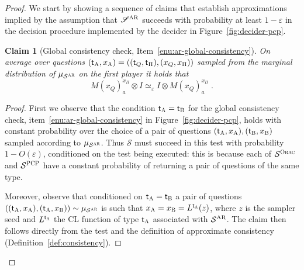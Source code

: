\documentclass[11pt]{article}
\newtheorem{claim}[theorem]{Claim}
\theoremstyle{definition}
\newcommand{\ot}{\otimes}
\newcommand{\eps}{\varepsilon}
\newcommand{\sampler}{\mathcal{S}}
\newcommand{\decider}{\mathcal{D}}
\newcommand{\strategy}{\mathscr{S}}
\newcommand{\gamestyle}[1]{\ensuremath{\textsc{#1}}\xspace}
\newcommand{\ora}{\gamestyle{Orac}}
\newcommand{\pcp}{\gamestyle{PCP}}
\newcommand{\ar}{\gamestyle{AR}}
\newcommand{\labelstyle}[1]{\ensuremath{\textsc{#1}}\xspace}
\newcommand{\tvarstyle}[1]{\mathsf{#1}}
\newcommand{\tvar}{\ensuremath{\tvarstyle{t}}}
\newcommand{\alice}{\labelstyle{A}}
\newcommand{\bob}{\labelstyle{B}}
\begin{document}
\begin{proof}
	We start by showing a sequence of claims that establish approximations implied
  by the assumption that $\strategy^\ar$ succeeds with probability at least
  $1-\eps$ in the decision procedure implemented by the decider in
  Figure~\ref{fig:decider-pcp}.

  \begin{claim}[Global consistency check, Item~\ref{enu:ar-global-consistency}]
    \label{claim:ar-1}
    On average over questions
    $(\tvar_\alice,x_\alice)=((\tvar_Q,\tvar_\Pi),({x}_Q, x_{\Pi}))$ sampled
    from the marginal distribution of $ \mu_{\sampler^\ar}$ on the first player
    it holds that
    \begin{equation}
      \label{eq:global-consistency}
      M({x}_Q)^{x_{\Pi}}_a \ot I \simeq_{\eps} I \ot M({x}_Q)^{x_{\Pi}}_a\;.
    \end{equation}
  \end{claim}

  \begin{proof}
    First we observe that the condition $\tvar_\alice = \tvar_\bob$ for the
    global consistency check, item~\ref{enu:ar-global-consistency} in
    Figure~\ref{fig:decider-pcp}, holds with constant probability over the
    choice of a pair of questions $(\tvar_\alice,x_\alice),(\tvar_\bob,x_\bob)$
    sampled according to $\mu_{\sampler^\ar}$.
    Thus $\strategy$ must succeed in this test with probability $1-O(\eps)$,
    conditioned on the test being executed: this is because each of
    $\sampler^\ora$ and $\sampler^\pcp$ have a constant probability of returning
    a pair of questions of the same type.

    Moreover, observe that conditioned on $\tvar_\alice = \tvar_\bob$ a pair of
    questions $((\tvar_\alice,x_\alice),(\tvar_\alice,x_\bob))\sim
    \mu_{\sampler^\ar}$ is such that $x_\alice = x_\bob = L^{\tvar_\alice}(z)$,
    where $z$ is the sampler seed and $L^{\tvar_\alice}$ the CL function of type
    $\tvar_\alice$ associated with $\sampler^\ar$.
    The claim then follows directly from the test and the definition of
    approximate consistency (Definition~\ref{def:consistency}).
  \end{proof}


\end{proof}
\end{document}

